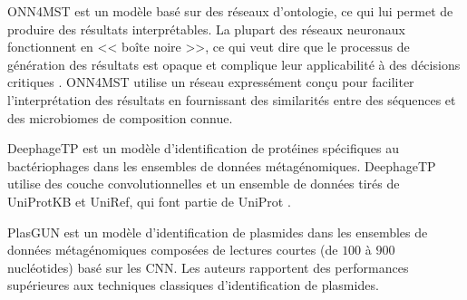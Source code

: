 ONN4MST \cite{zha2022} est un modèle basé sur des réseaux d'ontologie, ce qui lui permet de produire
des résultats interprétables. La plupart des réseaux neuronaux fonctionnent en << boîte noire >>, ce
qui veut dire que le processus de génération des résultats est opaque et complique leur
applicabilité à des décisions critiques \cite{rudin2019}. ONN4MST utilise un réseau expressément
conçu pour faciliter l'interprétation des résultats en fournissant des similarités entre des
séquences et des microbiomes de composition connue.

DeephageTP \cite{chu2022} est un modèle d'identification de protéines spécifiques au bactériophages
dans les ensembles de données métagénomiques. DeephageTP utilise des couche convolutionnelles et un
ensemble de données tirés de UniProtKB et UniRef, qui font partie de UniProt \cite{uniprot}.

PlasGUN \cite{fang2020} est un modèle d'identification de plasmides dans les ensembles de données
métagénomiques composées de lectures courtes (de $100$ à $900$ nucléotides) basé sur les CNN. Les
auteurs rapportent des performances supérieures aux techniques classiques d'identification de
plasmides.
